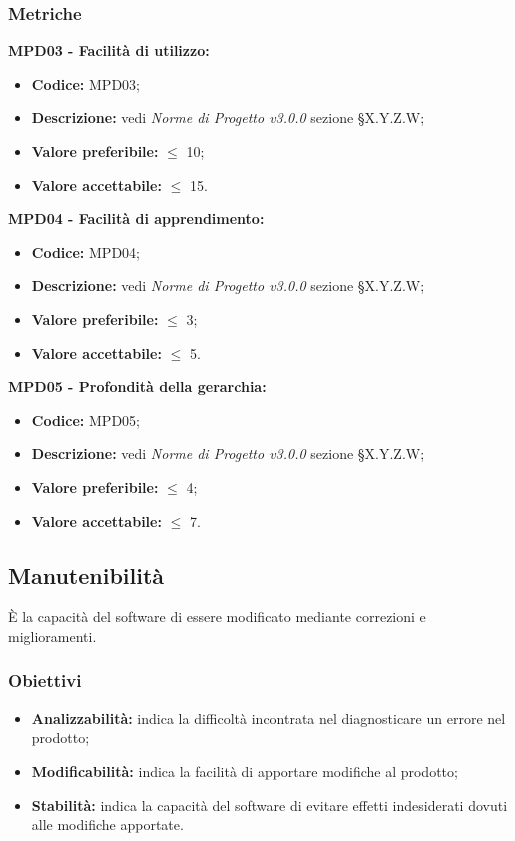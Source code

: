 \subsubsection{Metriche}
\textbf{MPD03 - Facilità di utilizzo:}
\begin{itemize}
    \item \textbf{Codice:} MPD03;
    \item \textbf{Descrizione:} vedi \textit{Norme di Progetto v3.0.0} sezione \S X.Y.Z.W;
    \item \textbf{Valore preferibile:} $\leq$ 10;
    \item \textbf{Valore accettabile:} $\leq$ 15.
\end{itemize}
\textbf{MPD04 - Facilità di apprendimento:}
\begin{itemize}
    \item \textbf{Codice:} MPD04;
    \item \textbf{Descrizione:} vedi \textit{Norme di Progetto v3.0.0} sezione \S X.Y.Z.W;
    \item \textbf{Valore preferibile:} $\leq$ 3;
    \item \textbf{Valore accettabile:} $\leq$ 5.
\end{itemize}
\textbf{MPD05 - Profondità della gerarchia:}
\begin{itemize}
    \item \textbf{Codice:} MPD05;
    \item \textbf{Descrizione:} vedi \textit{Norme di Progetto v3.0.0} sezione \S X.Y.Z.W;
    \item \textbf{Valore preferibile:} $\leq$ 4;
    \item \textbf{Valore accettabile:} $\leq$ 7.
\end{itemize}
\subsection{Manutenibilità}
È la capacità del software di essere modificato mediante correzioni e miglioramenti.
\subsubsection{Obiettivi}
\begin{itemize}
    \item \textbf{Analizzabilità:} indica la difficoltà incontrata nel diagnosticare un errore nel prodotto;
    \item \textbf{Modificabilità:} indica la facilità di apportare modifiche al prodotto;
    \item \textbf{Stabilità:} indica la capacità del software di evitare effetti indesiderati dovuti alle modifiche apportate.
\end{itemize}
